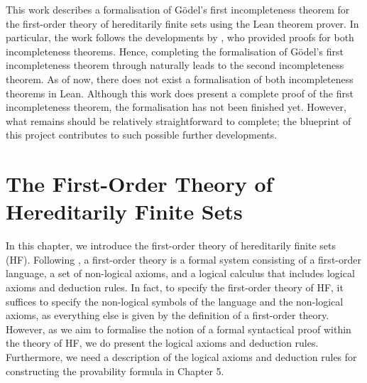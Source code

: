 
\noindent This work describes a formalisation of Gödel's first incompleteness theorem
for the first-order theory of hereditarily finite sets using the Lean theorem prover.
In particular, the work follows the developments by \cite{swierczkowski2003finite},
who provided proofs for both incompleteness theorems.
Hence, completing the formalisation of Gödel's first incompleteness theorem through 
\cite{swierczkowski2003finite} naturally leads to the second incompleteness theorem.
As of now, there does not exist a formalisation of both incompleteness theorems in Lean.
Although this work does present a complete proof of the first incompleteness theorem,
the formalisation has not been finished yet. 
However, what remains should be relatively straightforward to complete; 
the blueprint of this project contributes to such possible further developments.


%











\chapter{The First-Order Theory of Hereditarily Finite Sets}

In this chapter, we introduce the first-order theory of hereditarily finite sets (HF).
Following \cite{shoenfield1967mathematical}, a first-order theory is a formal system
consisting of a first-order language, a set of non-logical axioms, and a logical calculus 
that includes logical axioms and deduction rules.
In fact, to specify the first-order theory of HF, it suffices to specify 
the non-logical symbols of the language and the non-logical axioms, as everything else is
given by the definition of a first-order theory.
However, as we aim to formalise the notion of a formal syntactical proof within the theory of HF,
we do present the logical axioms and deduction rules.
Furthermore, we need a description of the logical axioms and deduction rules for 
constructing the provability formula in Chapter 5.

